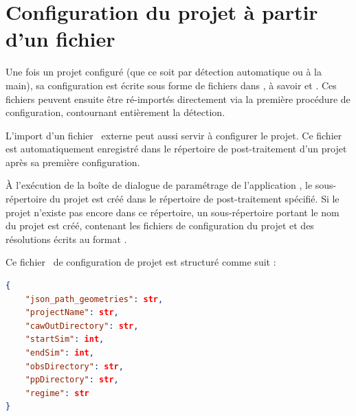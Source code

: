 



\section{Configuration du projet à partir d'un fichier \json}
\label{sec-json_config_project}

Une fois un projet configuré (que ce soit par détection automatique ou à la main), sa configuration est écrite sous forme de fichiers  dans , à savoir  et . Ces fichiers peuvent ensuite être ré-importés directement via la première procédure de configuration, contournant entièrement la détection.

L'import d'un fichier \json~externe peut aussi servir à configurer le projet. Ce fichier est automatiquement enregistré dans le répertoire de post-traitement d'un projet après sa première configuration.

À l'exécution de la boîte de dialogue de paramétrage de l'application \cwv, le sous-répertoire du projet est créé dans le répertoire de post-traitement spécifié. Si le projet n'existe pas encore dans ce répertoire, un sous-répertoire portant le nom du projet est créé, contenant les fichiers de configuration du projet et des résolutions écrits au format .


Ce fichier \json~de configuration de projet est structuré comme suit :

\begin{lstlisting}[language=json]
{
    "json_path_geometries": str,
    "projectName": str,
    "cawOutDirectory": str,
    "startSim": int,
    "endSim": int,
    "obsDirectory": str,
    "ppDirectory": str,
    "regime": str
}
\end{lstlisting}

